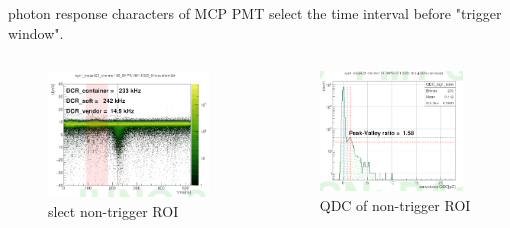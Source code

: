 \documentclass[11pt,compress,xcolor=x11names,UTF8]{beamer}
\begin{document}
\begin{frame}{photon response characters of MCP PMT }
select the time interval before "trigger window".
\begin{columns}
\begin{column}{.495\textwidth}
\begin{figure}
\centering
\includegraphics[width=0.94\textwidth]{figure/roiwave.png} %
\caption{slect non-trigger ROI}
\end{figure}
\end{column}
\begin{column}{.475\textwidth}
\begin{figure}
\centering
\includegraphics[width=0.94\textwidth]{figure/roiqdc.png} %
\caption{QDC of non-trigger ROI}
\end{figure}
\end{column}
\end{columns}
\end{frame}
\end{document}
